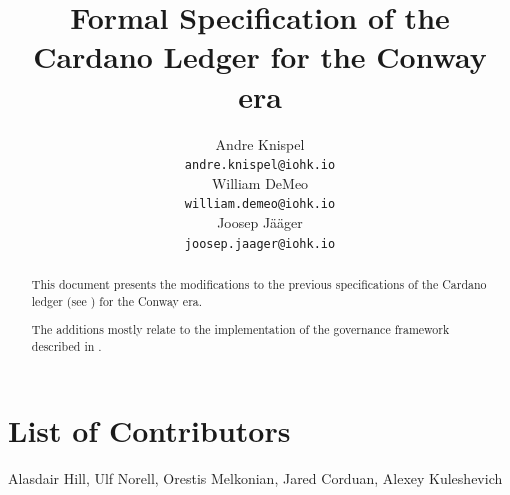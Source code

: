 \documentclass[11pt,a4paper,dvipsnames]{article}
\begin{document}
\title{Formal Specification of the Cardano Ledger for the Conway era}

\author{
   Andre Knispel \\ {\small \texttt{andre.knispel@iohk.io}} \\
   William DeMeo \\ {\small \texttt{william.demeo@iohk.io}} \\
   Joosep Jääger \\ {\small \texttt{joosep.jaager@iohk.io}} \\
   }

\date{}

\maketitle

\begin{abstract}
  This document presents the modifications to the previous
  specifications of the Cardano ledger (see
  \cite{cardano_shelley_spec,cardano_shelley_ma_spec,cardano_alonzo_spec,cardano_babbage_spec})
  for the Conway era.

  The additions mostly relate to the implementation of the governance
  framework described in \cite{cip1694}.
\end{abstract}

\section*{List of Contributors}
\label{acknowledgements}

Alasdair Hill, Ulf Norell, Orestis Melkonian, Jared Corduan, Alexey Kuleshevich

\tableofcontents


















\clearpage

\appendix




\end{document}

